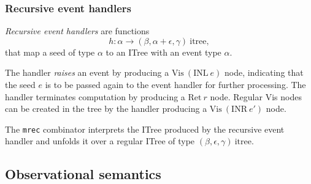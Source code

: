\documentclass[graybox,envcountsect]{SVMonoEnhanced}
\begin{document}
\subsubsection{Recursive event handlers}
\label{sec:event-handlers}

\emph{Recursive event handlers} are functions
\begin{equation*}
  h : \alpha \to (\beta, \alpha + \epsilon, \gamma)\ \text{itree},
\end{equation*}
that map a seed of type $\alpha$ to an ITree with an event type $\alpha$.

The handler \emph{raises} an event by producing a $\text{Vis}\ (\text{INL}\ e)$ node, indicating that the seed $e$ is to be passed again to the event handler for further processing. The handler terminates computation by producing a $\text{Ret}\ r$ node. Regular Vis nodes can be created in the tree by the handler producing a $\text{Vis}\ (\text{INR}\ e')$ node.

The \verb|mrec| combinator \cite{xia_executable_nodate} interprets the ITree produced by the recursive event handler and unfolds it over a regular ITree of type $(\beta, \epsilon, \gamma)\ \text{itree}$.


\subsection{Observational semantics}
\label{sec:observ-semant}


\end{document}
